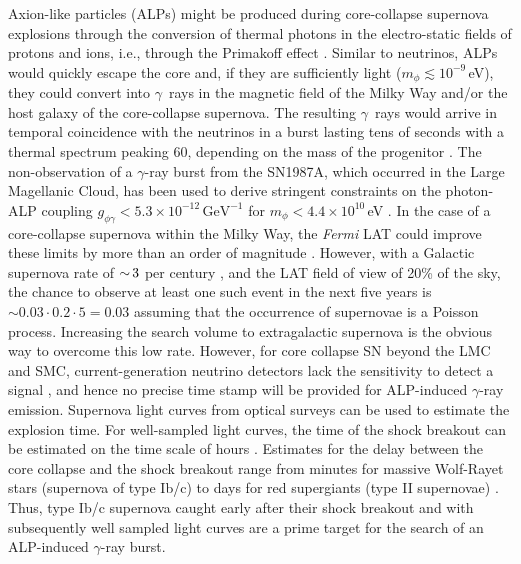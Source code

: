 Axion-like particles (ALPs) might be produced during core-collapse supernova explosions through the conversion of thermal photons in the electro-static fields of protons and ions, i.e., through the Primakoff effect \citep{1996slfp.book.....R}.  
Similar to neutrinos, ALPs would quickly escape the core and, if they are sufficiently light ($m_\phi \lesssim 10^{-9}\,$eV), they could convert into $\gamma$~rays in the magnetic field of the Milky Way and/or the host galaxy of the core-collapse supernova. 
The resulting $\gamma$~rays would arrive in temporal coincidence with the neutrinos in a burst lasting tens of seconds with a 
thermal spectrum peaking 60\MeV, depending on the mass of the progenitor \citep{2015JCAP...02..006P}.
The non-observation of a $\gamma$-ray burst from the SN1987A, which occurred in the Large Magellanic Cloud, has been used to derive stringent constraints on the photon-ALP coupling $g_{\phi\gamma}<5.3\times10^{-12}\,\mathrm{GeV}^{-1}$ for $m_\phi < 4.4\times10^{10} $\,eV \citep{1996PhLB..383..439B, 1996PhRvL..77.2372G,2015JCAP...02..006P}.
In the case of a core-collapse supernova within the Milky Way, the \textit{Fermi} LAT could improve these limits by more than an order of magnitude \citep{2017PhRvL.118a1103M}. 
However, with a Galactic supernova rate of $ {\sim}\, 3$ per century \citep[e.g.,][]{2013ApJ...778..164A}, and the LAT field of view of 20\% of the sky, the chance to observe at least one such event in the next five years is $\sim 0.03 \cdot 0.2 \cdot 5 = 0.03$ assuming that the occurrence of supernovae is a Poisson process. 
Increasing the search volume to extragalactic supernova is the obvious way to overcome this low rate. 
However, for core collapse SN beyond the LMC and SMC, current-generation neutrino detectors lack the sensitivity to detect a signal \citep[e.g.,][]{2011PhRvD..83l3008K}, and hence no precise time stamp will be provided for ALP-induced $\gamma$-ray emission. 
Supernova light curves from optical surveys can be used to estimate the explosion time. 
For well-sampled light curves, the time of the shock breakout can be estimated on the time scale of hours \citep{2010APh....33...19C}. 
Estimates for the delay between the core collapse and the shock breakout range from minutes for massive Wolf-Rayet stars (supernova of type Ib/c) to days for red supergiants (type II supernovae) \citep{2013ApJ...778...81K}. 
Thus, type Ib/c supernova caught early after their shock breakout and with subsequently well sampled light curves are a prime target for the search of an ALP-induced $\gamma$-ray burst. 

